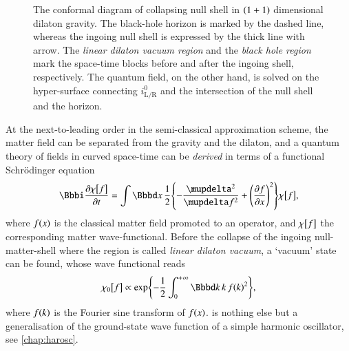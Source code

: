 \begin{figure}
\begin{center}

\end{center}
\caption[Collapsing null matter in dilaton gravity]{The conformal 
diagram of collapsing null shell in ${\left(1+1\right)}$ dimensional dilaton gravity. 
The black-hole horizon is marked by the dashed line, whereas the ingoing null 
shell is expressed by the thick line with arrow. The \emph{linear dilaton 
vacuum region} and the \emph{black hole region} mark the space-time blocks 
before and after the ingoing shell, respectively. The quantum field, on the 
other hand, is solved on the hyper-surface connecting $i^0_\text{L/R}$ and the 
intersection of the null shell and the horizon.
\label{fig:dil-col-bod}}
\end{figure}

At the next-to-leading order in the semi-classical approximation scheme, the 
matter field can be separated from the gravity and the dilaton, and a quantum 
theory of fields in curved space-time can be \emph{derived} in terms of a 
functional Schrödinger equation
\begin{equation}
	\ii \frpa{\sfun{\chi}{f}}{t} = \int \dd x\,\frac{1}{2}
	\cbr{-\frdva{^2}{f^2} + \rbr{\frpa{f}{x}}^2} \sfun{\chi}{f},
\label{eq:functional-Sch-chi}
\end{equation}
where ${f}\mathopen{}\left(x\right)\mathclose{}$ is the classical matter field promoted to an operator, and 
${\chi}\mathopen{}\left[f\right]\mathclose{}$ the corresponding matter wave-functional. Before the collapse 
of the ingoing null-matter-shell where the region is called \emph{linear dilaton 
vacuum}, a `vacuum' state can be found, whose wave functional reads
\begin{equation}
	\sfun{\chi_0}{f} \propto
	\cfun{\exp}{-\frac{1}{2}\int_{0}^{+\infty}\dd k\, k \, \rfun{f}{k}^2},
\label{eq:vacuum-wave-functional-f}
\end{equation}
where ${f}\mathopen{}\left(k\right)\mathclose{}$ is the Fourier sine transform of ${f}\mathopen{}\left(x\right)\mathclose{}$. 
 is nothing else but a generalisation of the 
ground-state wave function of a simple harmonic oscillator, see 
\cref{chap:harosc}.

